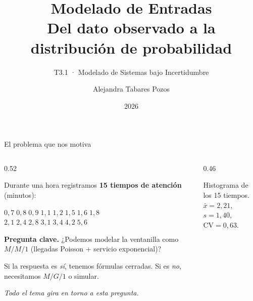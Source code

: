\documentclass[aspectratio=1610, 10pt]{beamer}
\title[T3.1 Modelado de Entradas]{%
  Modelado de Entradas\\[2pt]
  \large Del dato observado a la distribución de probabilidad}
\subtitle{T3.1 · Modelado de Sistemas bajo Incertidumbre}
\author{Alejandra Tabares Pozos}
\institute{Universidad de los Andes · Ingeniería Industrial}
\date{2026}
\begin{document}
\begin{frame}\titlepage\end{frame}


\begin{frame}{El problema que nos motiva}
  \begin{columns}[T]
    \begin{column}{0.52\textwidth}
      \begin{situacionbox}
        \footnotesize
        Durante una hora registramos \textbf{15 tiempos de atención} (minutos):
        \vspace{2pt}
        \begin{center}\scriptsize
          $0{,}7\; 0{,}8\; 0{,}9\; 1{,}1\; 1{,}2\; 1{,}5\; 1{,}6\; 1{,}8$\\
          $2{,}1\; 2{,}4\; 2{,}8\; 3{,}1\; 3{,}4\; 4{,}2\; 5{,}6$
        \end{center}
      \end{situacionbox}

      \vspace{4pt}
      \textbf{Pregunta clave.} ¿Podemos modelar la ventanilla como $M/M/1$
      (llegadas Poisson + servicio exponencial)?

      \vspace{4pt}
      Si la respuesta es \emph{sí}, tenemos fórmulas cerradas.
      Si es \emph{no}, necesitamos $M/G/1$ o simular.

      \vspace{4pt}
      \emph{Todo el tema gira en torno a esta pregunta.}
    \end{column}
    \begin{column}{0.46\textwidth}
      \begin{center}\scriptsize
        Histograma de los 15 tiempos.\\
        $\bar x = 2{,}21$, $s = 1{,}40$, $\mathrm{CV} = 0{,}63$.
      \end{center}
    \end{column}
  \end{columns}
\end{frame}
\end{document}
